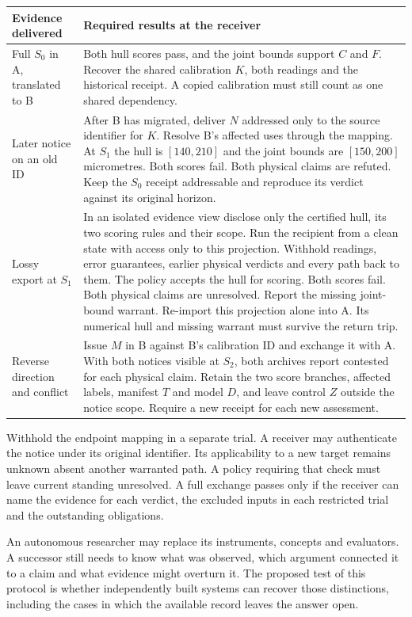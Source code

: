 \documentclass[11pt,a4paper]{article}
\newcommand{\topic}[1]{\par\smallskip{\sffamily\bfseries\color{ink}#1\par}\nobreak}
\begin{document}
\small
\begin{tabularx}{\linewidth}{@{}L{.22\linewidth}Y@{}}
\toprule
\textbf{Evidence delivered} & \textbf{Required results at the receiver} \\ \midrule
Full $S_0$ in A, translated to B & Both hull scores pass, and the joint bounds support $C$ and $F$. Recover the shared calibration $K$, both readings and the historical receipt. A copied calibration must still count as one shared dependency. \\
Later notice on an old ID & After B has migrated, deliver $N$ addressed only to the source identifier for $K$. Resolve B's affected uses through the mapping. At $S_1$ the hull is $[140,210]$ and the joint bounds are $[150,200]$ micrometres. Both scores fail. Both physical claims are refuted. Keep the $S_0$ receipt addressable and reproduce its verdict against its original horizon. \\
Lossy export at $S_1$ & In an isolated evidence view disclose only the certified hull, its two scoring rules and their scope. Run the recipient from a clean state with access only to this projection. Withhold readings, error guarantees, earlier physical verdicts and every path back to them. The policy accepts the hull for scoring. Both scores fail. Both physical claims are unresolved. Report the missing joint-bound warrant. Re-import this projection alone into A. Its numerical hull and missing warrant must survive the return trip. \\
Reverse direction and conflict & Issue $M$ in B against B's calibration ID and exchange it with A. With both notices visible at $S_2$, both archives report contested for each physical claim. Retain the two score branches, affected labels, manifest $T$ and model $D$, and leave control $Z$ outside the notice scope. Require a new receipt for each new assessment. \\
\bottomrule
\end{tabularx}
\normalsize

Withhold the endpoint mapping in a separate trial. A receiver may authenticate the notice under its original identifier. Its applicability to a new target remains unknown absent another warranted path. A policy requiring that check must leave current standing unresolved. A full exchange passes only if the receiver can name the evidence for each verdict, the excluded inputs in each restricted trial and the outstanding obligations.

\topic{Conclusion}
An autonomous researcher may replace its instruments, concepts and evaluators. A successor still needs to know what was observed, which argument connected it to a claim and what evidence might overturn it. The proposed test of this protocol is whether independently built systems can recover those distinctions, including the cases in which the available record leaves the answer open.
\end{document}
